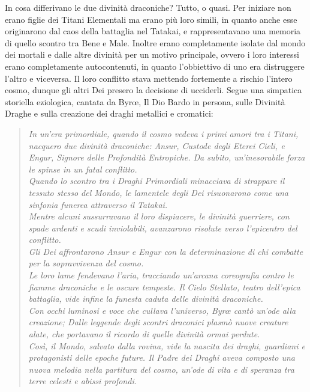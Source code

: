 \documentclass[a4paper]{report}
\begin{document}
\begin{multicols}{2}
In cosa differivano le due divinità draconiche? Tutto, o quasi. Per iniziare non erano figlie dei Titani Elementali ma erano più loro simili, in quanto anche esse originarono dal caos della battaglia nel Tatakai, e rappresentavano una memoria di quello scontro tra Bene e Male. Inoltre erano completamente isolate dal mondo dei mortali e dalle altre divinità per un motivo principale, ovvero i loro interessi erano completamente autocontenuti, in quanto l'obbiettivo di uno era distruggere l'altro e viceversa. Il loro conflitto stava mettendo fortemente a rischio l'intero cosmo, dunque gli altri Dei presero la decisione di ucciderli.
Segue una simpatica storiella eziologica, cantata da Byrœ, Il Dio Bardo in persona, sulle Divinità Draghe e sulla creazione dei draghi metallici e cromatici:
\begin{verse}
	
	\textit{In un'era primordiale, quando il cosmo vedeva i primi amori tra i Titani, nacquero due divinità draconiche: Ansur, Custode degli Eterei Cieli, e Engur, Signore delle Profondità Entropiche. Da subito, un'inesorabile forza le spinse in un fatal conflitto.\\
	Quando lo scontro tra i Draghi Primordiali minacciava di strappare il tessuto stesso del Mondo, le lamentele degli Dei risuonarono come una sinfonia funerea attraverso il Tatakai. \\
	Mentre alcuni sussurravano il loro dispiacere, le divinità guerriere, con spade ardenti e scudi inviolabili, avanzarono risolute verso l'epicentro del conflitto.\\
	Gli Dei affrontarono Ansur e Engur con la determinazione di chi combatte per la sopravvivenza del cosmo. \\Le loro lame fendevano l'aria, tracciando un'arcana coreografia contro le fiamme draconiche e le oscure tempeste.
	Il Cielo Stellato, teatro dell'epica battaglia, vide infine la funesta caduta delle divinità draconiche.\\
	Con occhi luminosi e voce che cullava l'universo, Byrœ cantò un'ode alla creazione; Dalle leggende degli scontri draconici plasmò nuove creature alate, che portavano il ricordo di quelle divinità ormai perdute.\\
	Così, il Mondo, salvato dalla rovina, vide la nascita dei draghi, guardiani e protagonisti delle epoche future. Il Padre dei Draghi aveva composto una nuova melodia nella partitura del cosmo, un'ode di vita e di speranza tra terre celesti e abissi profondi.}
\end{verse}


\end{multicols}
\end{document}
